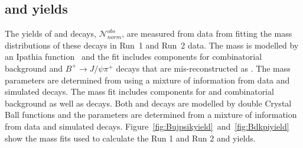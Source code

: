 {{%


\subsection{\bdkpi and \bujpsik yields}
\label{sec:yeilds}
The yields of \bujpsik and \bdkpi decays, $ \mathcal{N}^{obs}_{norm}$, are measured from data from fitting the mass distributions of these decays in Run~1 and Run~2 data. %
The \bujpsik mass \pdf is modelled by an Ipathia function~\cite{Santos:2013gra} and the fit includes components for combinatorial background and $B^{+} \to J/\psi \pi^{+}$ decays that are mis-reconstructed as \bujpsik. The mass \pdf parameters are determined from using a mixture of information from data and simulated decays. The \bdkpi mass fit includes components for \bskpi and combinatorial background as well as \bdkpi decays. Both \bdkpi and \bskpi decays are modelled by double Crystal Ball functions and the parameters are determined from a mixture of information from data and simulated decays. %
Figure~\ref{fig:Bujpsikyield}~and~\ref{fig:Bdkpiyield} show the mass fits used to calculate the Run 1 and Run 2 \bujpsik and \bdkpi yields.





}}
